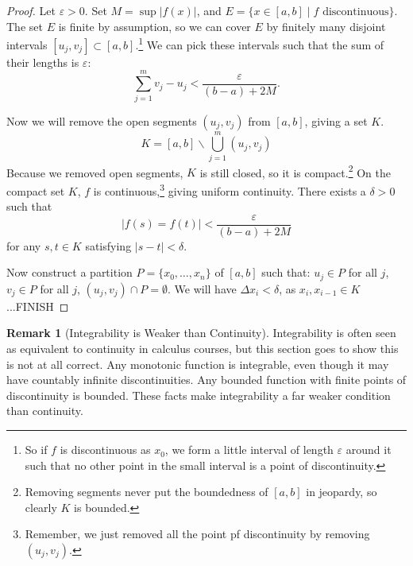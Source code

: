 \documentclass{article}
\theoremstyle{definition}
\newtheorem{remark}{Remark}[section]
\begin{document}
\begin{proof}
	Let $ \varepsilon>0 $. Set $ M=\sup |f(x)| $, and $ E=\{x\in[a,b]\mid f\text{ discontinuous}\} $. The set $ E $ is finite by assumption, so we can cover $ E $ by finitely many disjoint intervals $ [u_j,v_j]\subset[a,b] $.\footnote{So if $ f $ is discontinuous as $ x_0 $, we form a little interval of length $ \varepsilon $ around it such that no other point in the small interval is a point of discontinuity.} We can pick these intervals such that the sum of their lengths is $ \varepsilon $:
	$$\sum_{j=1}^{m} v_j-u_j<\frac{\varepsilon}{(b-a)+2M}. $$ 
	
	Now we will remove the open segments $ (u_j,v_j) $ from $ [a,b] $, giving a set $ K $. $$K=[a,b]\backslash\bigcup_{j=1}^m(u_j,v_j) $$ Because we removed open segments, $ K $ is still closed, so it is compact.\footnote{Removing segments never put the boundedness of $ [a,b] $ in jeopardy, so clearly $ K $ is bounded.} On the compact set $ K $, $ f $ is continuous,\footnote{Remember, we just removed all the point pf discontinuity by removing $ (u_j,v_j) $.} giving uniform continuity. There exists a $ \delta>0 $ such that $$|f(s)=f(t)|<\frac{\varepsilon}{(b-a)+2M} $$ for any $ s,t\in K $ satisfying $ |s-t|<\delta $.
	
	Now construct a partition $ P=\{x_0,\ldots,x_n\} $ of $ [a,b] $ such that: $ u_j\in P $ for all $ j $, $ v_j\in P $ for all $ j $, $ (u_j,v_j)\cap P=\emptyset $. We will have $ \Delta x_i<\delta $, as $ x_i,x_{i-1}\in K $...{\color{red}FINISH}
	
	
\end{proof}
\begin{remark}[Integrability is Weaker than Continuity]
Integrability is often seen as equivalent to continuity in calculus courses, but this section goes to show this is not at all correct. Any monotonic function is integrable, even though it may have countably infinite discontinuities. Any bounded function with finite points of discontinuity is bounded. These facts make integrability a far weaker condition than continuity. 
\end{remark}
\end{document}
